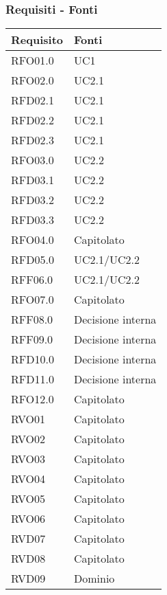 \subsubsection{Requisiti - Fonti}
{
    \setlength{\freewidth}{\dimexpr\textwidth-8\tabcolsep}
    \renewcommand{\arraystretch}{1.5}
    \centering
    \setlength{\aboverulesep}{0pt}
    \setlength{\belowrulesep}{0pt}
    \begin{longtable}{C{.50\freewidth} C{.50\freewidth}}
        \toprule 
        \textbf{Requisito} & \textbf{Fonti} \\
        \toprule
        \endhead

        RFO01.0  & UC1 \\
        RFO02.0  & UC2.1 \\
        RFD02.1  & UC2.1 \\
        RFD02.2  & UC2.1 \\
        RFD02.3  & UC2.1 \\
        RFO03.0  & UC2.2 \\
        RFD03.1  & UC2.2 \\
        RFD03.2  & UC2.2 \\
        RFD03.3  & UC2.2 \\
        RFO04.0  & Capitolato \\
        RFD05.0  & UC2.1/UC2.2 \\
        RFF06.0  & UC2.1/UC2.2 \\
        RFO07.0  & Capitolato \\
        RFF08.0  & Decisione interna \\
        RFF09.0  & Decisione interna \\
        RFD10.0  & Decisione interna \\
        RFD11.0  & Decisione interna \\
        RFO12.0  & Capitolato \\

        RVO01    & Capitolato \\
        RVO02    & Capitolato \\
        RVO03    & Capitolato \\
        RVO04    & Capitolato \\
        RVO05    & Capitolato \\
        RVO06    & Capitolato \\
        RVD07    & Capitolato \\
        RVD08    & Capitolato \\
        RVD09    & Dominio \\


\end{longtable}}
